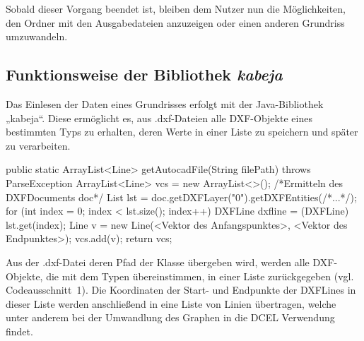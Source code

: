 Sobald dieser Vorgang beendet ist, bleiben dem Nutzer nun die Möglichkeiten, den Ordner mit den Ausgabedateien anzuzeigen oder einen anderen Grundriss umzuwandeln.\\

\subsection{Funktionsweise der Bibliothek \textit{kabeja}}
Das Einlesen der Daten eines Grundrisses erfolgt mit der Java-Bibliothek „kabeja“. 
Diese ermöglicht es, aus .dxf-Dateien alle DXF-Objekte eines bestimmten Typs zu erhalten, deren Werte in einer Liste zu speichern und später zu verarbeiten. \\

\begin{code}
	public static ArrayList<Line> getAutocadFile(String filePath) throws ParseException {
		ArrayList<Line> vcs = new ArrayList<>();
		/*Ermitteln des DXFDocuments doc*/
		List lst = doc.getDXFLayer("0").getDXFEntities(/*...*/);
		for (int index = 0; index < lst.size(); index++) {
			DXFLine dxfline = (DXFLine) lst.get(index);
			Line v = new Line(<Vektor des Anfangspunktes>, <Vektor des Endpunktes>);
			vcs.add(v);
		}
		return vcs;
	}
\end{code}

Aus der .dxf-Datei deren Pfad der Klasse  übergeben wird, werden alle DXF-Objekte, die mit dem Typen  übereinstimmen, in einer Liste zurückgegeben (vgl. Codeausschnitt~1). 
Die Koordinaten der Start- und Endpunkte der DXFLines  in dieser Liste werden anschließend in eine Liste von Linien übertragen, welche unter anderem bei der Umwandlung des Graphen in die DCEL Verwendung findet.